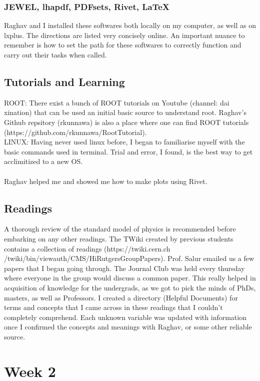\documentclass{article}
\begin{document}
\subsubsection{JEWEL, lhapdf, PDFsets, Rivet, LaTeX}
Raghav and I installed these softwares both locally on my computer, as well as on lxplus. The directions are listed very concisely online. An important nuance to remember is how to set the path for these softwares to correctly function and carry out their tasks when called.

\subsection{Tutorials and Learning}
ROOT: There exist a bunch of ROOT tutorials on Youtube (channel: dai xination) that can be used an initial basic source to understand root.
Raghav's Github repsitory (rkunnawa) is also a place where one can find ROOT tutorials (https://github.com/rkunnawa/RootTutorial).\\LINUX: Having never used linux before, I began to familiarise myself with the basic commands used in terminal. Trial and error, I found, is the best way to get acclimitized to a new OS.\\\\Raghav helped me and showed me how to make plots using Rivet.


\subsection{Readings}
A thorough review of the standard model of physics is recommended before embarking on any other readings.
The TWiki created by previous students contains a collection of readings (https://twiki.cern.ch /twiki/bin/viewauth/CMS/HiRutgersGroupPapers). Prof. Salur emailed us a few papers that I began going through.
The Journal Club was held every thursday where everyone in the group would discuss a common paper. This really helped in acquisition of knowledge for the undergrads, as we got to pick the minds of PhDs, masters, as well as Professors.  
I created a directory (Helpful Documents) for terms and concepts that I came across in these readings that I couldn't completely comprehend. Each unknown variable was updated with information once I confirmed the concepts and meanings with Raghav, or some other reliable source.

\newpage
\section{Week 2}
\end{document}
